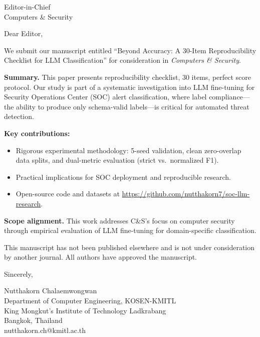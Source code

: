 \documentclass[11pt]{letter}
\begin{document}
\begin{letter}{Editor-in-Chief \\ Computers & Security}

\opening{Dear Editor,}

We submit our manuscript entitled ``Beyond Accuracy: A 30-Item Reproducibility Checklist for LLM Classification'' for consideration in \textit{Computers & Security}.

\textbf{Summary.} This paper presents reproducibility checklist, 30 items, perfect score protocol. Our study is part of a systematic investigation into LLM fine-tuning for Security Operations Center (SOC) alert classification, where label compliance---the ability to produce only schema-valid labels---is critical for automated threat detection.

\textbf{Key contributions:}
\begin{itemize}
\item Rigorous experimental methodology: 5-seed validation, clean zero-overlap data splits, and dual-metric evaluation (strict vs.\ normalized F1).
\item Practical implications for SOC deployment and reproducible research.
\item Open-source code and datasets at \url{https://github.com/nutthakorn7/soc-llm-research}.
\end{itemize}

\textbf{Scope alignment.} This work addresses C&S's focus on computer security through empirical evaluation of LLM fine-tuning for domain-specific classification.

This manuscript has not been published elsewhere and is not under consideration by another journal. All authors have approved the manuscript.

\closing{Sincerely,}

Nutthakorn Chalaemwongwan \\
Department of Computer Engineering, KOSEN-KMITL \\
King Mongkut's Institute of Technology Ladkrabang \\
Bangkok, Thailand \\
nutthakorn.ch@kmitl.ac.th

\end{letter}
\end{document}
